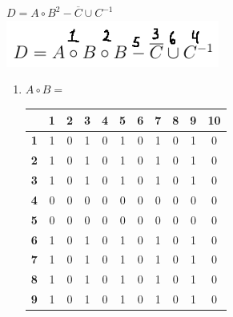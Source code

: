 \documentclass[a4paper,14pt]{extarticle}
\begin{document}
\begin{enumerate}[label=1.\arabic*.]
	      $D=A\circ B^2 - \overline{C} \cup C^{-1}$\\
	      \includegraphics[width=70mm]{1.2}\\
	      \begin{enumerate}[1) ]\item
		            $A\circ B = $  \begin{tabular}{|c|c|c|c|c|c|c|c|c|c|c|}
			            \hline
			                              & \textbf{1} & \textbf{2} & \textbf{3} & \textbf{4} & \textbf{5} & \textbf{6} & \textbf{7} & \textbf{8} & \textbf{9} & \textbf{10} \\
			            \hline\textbf{1}  & 1          & 0          & 1          & 0          & 1          & 0          & 1          & 0          & 1          & 0           \\
			            \hline\textbf{2}  & 1          & 0          & 1          & 0          & 1          & 0          & 1          & 0          & 1          & 0           \\
			            \hline\textbf{3}  & 1          & 0          & 1          & 0          & 1          & 0          & 1          & 0          & 1          & 0           \\
			            \hline\textbf{4}  & 0          & 0          & 0          & 0          & 0          & 0          & 0          & 0          & 0          & 0           \\
			            \hline\textbf{5}  & 0          & 0          & 0          & 0          & 0          & 0          & 0          & 0          & 0          & 0           \\
			            \hline\textbf{6}  & 1          & 0          & 1          & 0          & 1          & 0          & 1          & 0          & 1          & 0           \\
			            \hline\textbf{7}  & 1          & 0          & 1          & 0          & 1          & 0          & 1          & 0          & 1          & 0           \\
			            \hline\textbf{8}  & 1          & 0          & 1          & 0          & 1          & 0          & 1          & 0          & 1          & 0           \\
			            \hline\textbf{9}  & 1          & 0          & 1          & 0          & 1          & 0          & 1          & 0          & 1          & 0           \\

\end{tabular}
\end{enumerate}
\end{enumerate}
\end{document}
